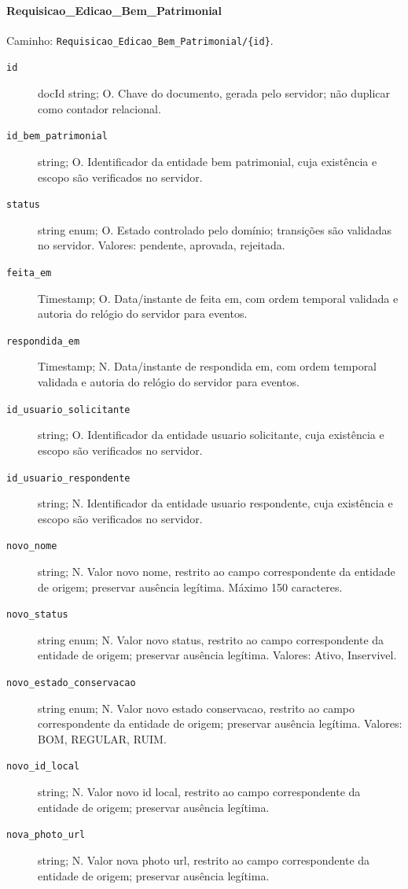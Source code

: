 \paragraph{Requisicao\_Edicao\_Bem\_Patrimonial}\mbox{}\par
Caminho: \texttt{Requisicao\_Edicao\_Bem\_Patrimonial/\{id\}}.
\begin{description}
\item[\texttt{id}] docId string; O. Chave do documento, gerada pelo servidor; não duplicar como contador relacional.
\item[\texttt{id\_bem\_patrimonial}] string; O. Identificador da entidade bem patrimonial, cuja existência e escopo são verificados no servidor.
\item[\texttt{status}] string enum; O. Estado controlado pelo domínio; transições são validadas no servidor. Valores: pendente, aprovada, rejeitada.
\item[\texttt{feita\_em}] Timestamp; O. Data/instante de feita em, com ordem temporal validada e autoria do relógio do servidor para eventos.
\item[\texttt{respondida\_em}] Timestamp; N. Data/instante de respondida em, com ordem temporal validada e autoria do relógio do servidor para eventos.
\item[\texttt{id\_usuario\_solicitante}] string; O. Identificador da entidade usuario solicitante, cuja existência e escopo são verificados no servidor.
\item[\texttt{id\_usuario\_respondente}] string; N. Identificador da entidade usuario respondente, cuja existência e escopo são verificados no servidor.
\item[\texttt{novo\_nome}] string; N. Valor novo nome, restrito ao campo correspondente da entidade de origem; preservar ausência legítima. Máximo 150 caracteres.
\item[\texttt{novo\_status}] string enum; N. Valor novo status, restrito ao campo correspondente da entidade de origem; preservar ausência legítima. Valores: Ativo, Inservivel.
\item[\texttt{novo\_estado\_conservacao}] string enum; N. Valor novo estado conservacao, restrito ao campo correspondente da entidade de origem; preservar ausência legítima. Valores: BOM, REGULAR, RUIM.
\item[\texttt{novo\_id\_local}] string; N. Valor novo id local, restrito ao campo correspondente da entidade de origem; preservar ausência legítima.
\item[\texttt{nova\_photo\_url}] string; N. Valor nova photo url, restrito ao campo correspondente da entidade de origem; preservar ausência legítima.

\end{description}
